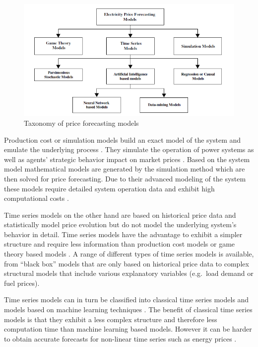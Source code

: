 \begin{figure}[htbp]
	\centering
		\includegraphics{figures/state_of_the_art/classification_of_price_forecasting_models.PNG}
	\caption{Taxonomy of price forecasting models \cite{aggarwal2009electricity}}
	\label{fig:classification_of_price_forecasting_models}
\end{figure}

Production cost or simulation models build an exact model of the system and emulate the underlying process \cite{aggarwal2009electricity}. 
They simulate the operation of power systems as well as agents' strategic behavior impact on market prices \cite{gonzalez2005modeling,lora2007electricity}. Based on the system model mathematical models are generated by the simulation method which are then solved for price forecasting. 
Due to their advanced modeling of the system these models require detailed system operation data and exhibit high computational costs \cite{aggarwal2009electricity}. 

Time series models on the other hand are based on historical price data and statistically model price evolution but do not model the underlying system's behavior in detail. Time series models have the advantage to exhibit a simpler structure and require less information than production cost models or game theory based models \cite{lora2007electricity}. A range of different types of time series models is available, from "`black box"' models that are only based on historical price data to complex structural models that include various explanatory variables (e.g.~load demand or fuel prices). 

Time series models can in turn be classified into classical time series models and models based on machine learning techniques \cite{lora2007electricity}. The benefit of classical time series models is that they exhibit a less complex structure and therefore less computation time than machine learning based models. However it can be harder to obtain accurate forecasts for non-linear time series such as energy prices \cite{lora2007electricity}. 

